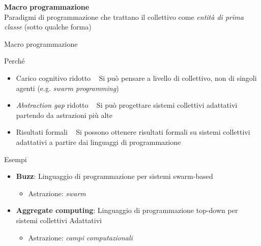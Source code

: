 \documentclass[presentation, 10pt,aspectratio=169]{beamer}\mode<presentation>{\usetheme{AMSBolognaFC}}
\begin{document}
{


\begin{frame}[c]
	
	{
	\color{customfg}

	\begin{center}
	\Large\textbf{Macro programmazione} \\
	Paradigmi di programmazione che trattano il \alert{collettivo} come \emph{entità di prima classe} (sotto qualche forma)
	\end{center}

	\vspace{1cm}	
}
\end{frame}
}
\begin{frame}{Macro programmazione}
	\begin{alertblock}{Perché}
		\begin{itemize}
			\item Carico cognitivo ridotto \faArrowRight ~ Si può pensare a livello di collettivo, non di singoli agenti (e.g. \emph{swarm programming})
			\item \emph{Abstraction gap} ridotto \faArrowRight ~ Si può progettare sistemi collettivi adattativi partendo da astrazioni più alte
			\item Risultati formali \faArrowRight ~ Si possono ottenere risultati formali su sistemi collettivi adattativi a partire dai linguaggi di programmazione
		\end{itemize}
	\end{alertblock}
	\begin{block}{Esempi}
		\begin{itemize}
			\item \textbf{Buzz}: Linguaggio di programmazione per sistemi swarm-based 
			\begin{itemize}
				\item Astrazione: \emph{swarm}
			\end{itemize}
			\item \alert{\textbf{Aggregate computing}}: Linguaggio di programmazione top-down per sistemi collettivi Adattativi
			\begin{itemize}
				\item Astrazione: \emph{campi computazionali}
			\end{itemize}
		\end{itemize}
	\end{block}
\end{frame}
\end{document}
